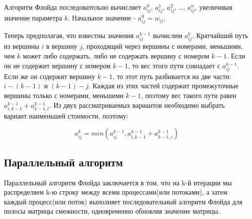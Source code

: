 Алгоритм Флойда последовательно вычисляет $a^0_{ij}$, $a^1_{ij}$, $a^2_{ij}$, …, $a^n_{ij}$, увеличивая значение параметра $k$. Начальное значение - $a^0_{ij} = w_{ij}$.

Теперь предполагая, что известны значения $a^{k - 1}_{ij}$ вычислим $a^k_{ij}$. Кратчайший путь из вершины $i$ в вершину $j$, проходящий через вершины с номерами, меньшими, чем $k$ может либо содержать, либо не содержать вершину с номером $k - 1$. Если он не содержит вершину с номером $k - 1$, то вес этого пути совпадает с $a^{k - 1}_{ij}$. Если же он содержит вершину $k - 1$, то этот путь разбивается на две части: $i - (k - 1)$ и $(k - 1) - j$. Каждая из этих частей содержит промежуточные вершины только с номерами, меньшими $k - 1$, поэтому вес такого пути равен $a^{k - 1}_{i,k-1} + a^{k - 1}_{k-1,i}$. Из двух рассматриваемых вариантов необходимо выбрать вариант наименьшей стоимости, поэтому:

\begin{equation}
	a^k_{ij} = min(a^{k - 1}_{ij}, a^{k - 1}_{i,k-1} + a^{k - 1}_{k-1,i})
\end{equation}

\subsection*{Параллельный алгоритм}

Параллельный алгоритм Флойда заключается в том, что на k-й итерации мы распределяем k-ю строку между всеми процессами(или потоками), а затем каждый процесс(или поток) выполняет последовательный алгоритм Флойда для полосы матрицы смежности, одновременно обновляя значение матрицы.

